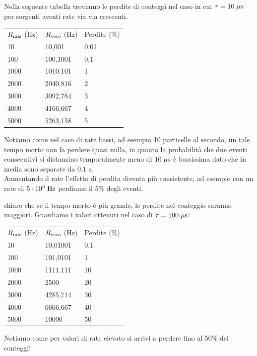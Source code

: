 \begin{esempio}
   Nella seguente tabella troviamo le perdite di conteggi nel caso in cui $\tau=10 \; \rm \mu s$ per sorgenti aventi rate via via crescenti.
   \begin{center}
      \begin{tabular}{p{2cm}p{3cm}p{2.5cm}}
         $R_{\rm mis}$ (Hz) & $R_{\rm vero}$ (Hz) & Perdite (\%)\\
         10 & 10,001 & 0,01\\
         100 & 100,1001 & 0,1\\
         1000 & 1010.101 & 1\\
         2000 & 2040,816 & 2\\
         3000 & 3092,784 & 3\\
         4000 & 4166,667 & 4\\
         5000 & 5263,158 & 5
      \end{tabular}
   \end{center}
   Notiamo come nel caso di rate bassi, ad esempio 10 particelle al secondo, un tale tempo morto non fa perdere quasi nulla, in quanto la probabilità che due eventi consecutivi si distanzino temporalmente meno di $10 \; \rm \mu s$ è bassissima dato che in media sono separate da $0.1$ s.\\
   Aumentando il rate l'effetto di perdita diventa più consistente, ad esempio con un rate di $5 \cdot 10^3 \; \rm Hz$ perdiamo il 5\% degli eventi.
\end{esempio}

\begin{esempio}
   \E chiaro che se il tempo morto è più grande, le perdite nel conteggio saranno maggiori. Guardiamo i valori ottenuti nel caso di $\tau=100 \; \rm \mu s$:
   \begin{center}
      \begin{tabular}{p{2cm}p{3cm}p{2.5cm}}
         $R_{\rm mis}$ (Hz) & $R_{\rm vero}$ (Hz) & Perdite (\%)\\
         10 & 10,01001 & 0,1\\
         100 & 101,0101 & 1\\
         1000 & 1111.111 & 10\\
         2000 & 2500 & 20\\
         3000 & 4285,714 & 30\\
         4000 & 6666,667 & 40\\
         5000 & 10000 & 50
      \end{tabular}
   \end{center}
   Notiamo come per valori di rate elevato si arrivi a perdere fino al 50\% dei conteggi!
\end{esempio}


